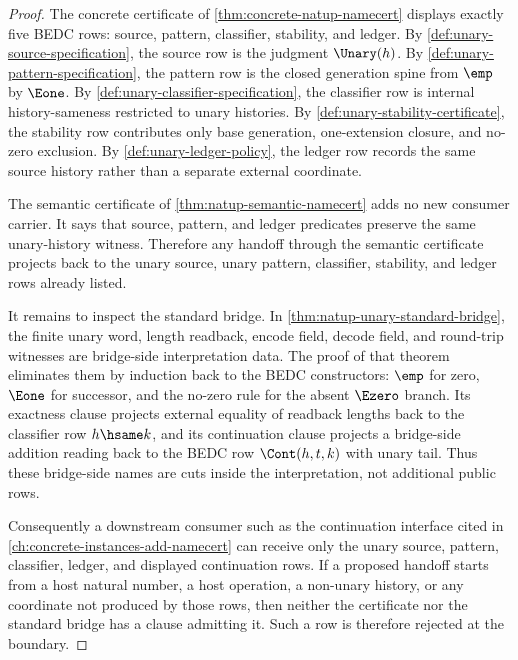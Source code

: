 \begin{proof}
The concrete certificate of \autoref{thm:concrete-natup-namecert} displays
exactly five BEDC rows: source, pattern, classifier, stability, and ledger.
By \autoref{def:unary-source-specification}, the source row is the judgment
$\Unary(h)$. By \autoref{def:unary-pattern-specification}, the pattern
row is the closed generation spine from $\emp$ by $\Eone$. By
\autoref{def:unary-classifier-specification}, the classifier row is internal
history-sameness restricted to unary histories. By
\autoref{def:unary-stability-certificate}, the stability row contributes only
base generation, one-extension closure, and no-zero exclusion. By
\autoref{def:unary-ledger-policy}, the ledger row records the same source
history rather than a separate external coordinate.

The semantic certificate of \autoref{thm:natup-semantic-namecert} adds no new
consumer carrier. It says that source, pattern, and ledger predicates preserve
the same unary-history witness. Therefore any handoff through the semantic
certificate projects back to the unary source, unary pattern, classifier,
stability, and ledger rows already listed.

It remains to inspect the standard bridge. In
\autoref{thm:natup-unary-standard-bridge}, the finite unary word, length
readback, encode field, decode field, and round-trip witnesses are bridge-side
interpretation data. The proof of that theorem eliminates them by induction
back to the BEDC constructors: $\emp$ for zero, $\Eone$ for successor, and the
no-zero rule for the absent $\Ezero$ branch. Its exactness clause projects
external equality of readback lengths back to the classifier row $h\hsame k$,
and its continuation clause projects a bridge-side addition reading back to the
BEDC row $\Cont(h,t,k)$ with unary tail. Thus these bridge-side names are cuts
inside the interpretation, not additional public rows.

Consequently a downstream consumer such as the continuation interface cited in
\autoref{ch:concrete-instances-add-namecert} can receive only the unary source,
pattern, classifier, ledger, and displayed continuation rows. If a proposed
handoff starts from a host natural number, a host operation, a non-unary
history, or any coordinate not produced by those rows, then neither the
certificate nor the standard bridge has a clause admitting it. Such a row is
therefore rejected at the boundary.
\end{proof}

